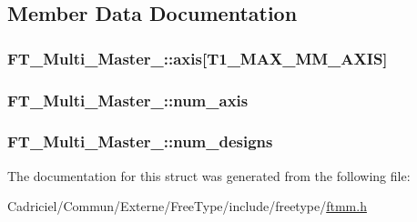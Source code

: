 \subsection{Member Data Documentation}
\hypertarget{struct_f_t___multi___master___a1eb062ff3b5ac245ab9421a46b349818}{
\subsubsection[{axis}]{ F\-T\-\_\-\-Multi\-\_\-\-Master\-\_\-\-::axis\mbox{[}{\bf T1\-\_\-\-M\-A\-X\-\_\-\-M\-M\-\_\-\-A\-X\-I\-S}\mbox{]}}}\label{struct_f_t___multi___master___a1eb062ff3b5ac245ab9421a46b349818}
\hypertarget{struct_f_t___multi___master___a90a0ace4e40b91912259ad52fc86fb6f}{
\subsubsection[{num\-\_\-axis}]{ F\-T\-\_\-\-Multi\-\_\-\-Master\-\_\-\-::num\-\_\-axis}}\label{struct_f_t___multi___master___a90a0ace4e40b91912259ad52fc86fb6f}
\hypertarget{struct_f_t___multi___master___a78b797ee560f4b00795a7dce9656178d}{
\subsubsection[{num\-\_\-designs}]{ F\-T\-\_\-\-Multi\-\_\-\-Master\-\_\-\-::num\-\_\-designs}}\label{struct_f_t___multi___master___a78b797ee560f4b00795a7dce9656178d}


The documentation for this struct was generated from the following file\-:\begin{DoxyCompactItemize}
\item 
Cadriciel/\-Commun/\-Externe/\-Free\-Type/include/freetype/\hyperlink{ftmm_8h}{ftmm.\-h}\end{DoxyCompactItemize}
